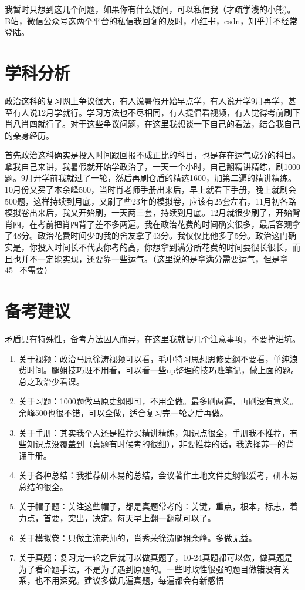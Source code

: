 \documentclass[lang=cn,blue,10pt,scheme=chinese,twocol]{zznote}
\begin{document}
\begin{note}
	我暂时只想到这几个问题，如果你有什么疑问，可以私信我（才疏学浅的小熊)。B站，微信公众号这两个平台的私信我回复的及时，小红书，csdn，知乎并不经常登陆。
\end{note}

\section{学科分析}
政治这科的复习网上争议很大，有人说暑假开始早点学，有人说开学9月再学，甚至有人说12月学就行。学习方法也不尽相同，有人提倡看视频，有人觉得考前刷下肖八肖四就行了。对于这些争议问题，在这里我想谈一下自己的看法，结合我自己的亲身经历。

首先政治这科确实是投入时间跟回报不成正比的科目，也是存在运气成分的科目。拿我自己来讲，我暑假就开始学政治了，一天一个小时，自己翻精讲精练，刷1000题。9月开学前我就过了一轮，然后再刷仓盾的精选1600，加第二遍的精讲精练。10月份又买了本余峰500，当时肖老师手册出来后，早上就看下手册，晚上就刷会500题，这样持续到月底，又刷了些23年的模拟卷，应该有25套左右，11月初各路模拟卷出来后，我又开始刷，一天两三套，持续到月底。12月就很少刷了，开始背肖四，在考前把肖四背了差不多两遍。我在政治花费的时间确实很多，最后客观拿了48分。政治花费时间少的我的舍友拿了43分。我仅仅比他多了5分。政治这门确实是，你投入时间长不代表你考的高，你想拿到满分所花费的时间要很长很长，而且也并不一定能实现，还要靠一些运气。（这里说的是拿满分需要运气，但是拿45+不需要）



\section{备考建议}
\begin{definition}
	矛盾具有特殊性，备考方法因人而异，在这里我就提几个注意事项，不要掉进坑。
\end{definition}
\begin{enumerate}

	\item {关于视频：政治马原徐涛视频可以看，毛中特习思想思修史纲不要看，单纯浪费时间。腿姐技巧班不用看，可以看一些up整理的技巧班笔记，做上面的题。总之政治少看课。}
	\item {关于习题：1000题做马原史纲即可，不用全做。最多刷两遍，再刷没有意义。余峰500也很不错，可以全做，适合复习完一轮之后再做。}
	\item {关于手册：其实我个人还是推荐买精讲精练，知识点很全，手册我不推荐，有些知识点没覆盖到（真题有时候考的很细），非要推荐的话，我选择苏一的背诵手册。}
	\item {关于各种总结：我推荐研木易的总结，会议著作土地文件史纲很爱考，研木易总结的很全。}
	\item {关于帽子题：关注这些帽子，都是真题常考的：关键，重点，根本，标志，着力点，首要，突出，决定。每天早上翻一翻就可以了。}
	\item {关于模拟卷：只做主流老师的，肖秀荣徐涛腿姐余峰。多做无益。}
	\item {关于真题：复习完一轮之后就可以做真题了，10-24真题都可以做，做真题是为了看命题手法，不是为了遇到原题的。一些时政性很强的题目做错没有关系，也不用深究。建议多做几遍真题，每遍都会有新感悟}

\end{enumerate}
\end{document}
